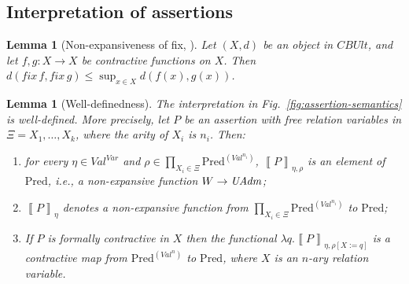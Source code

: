 \documentclass{LMCS}
\newtheorem{lemma}[theorem]{Lemma}
\theoremstyle{remark}
\newcommand{\Val}{\ensuremath{\mathit{Val}}\xspace}
\newcommand{\Var}{\ensuremath{\mathit{Var}}\xspace}
\newcommand{\den}[1]{\left\llbracket #1
  \right\rrbracket}
\newcommand{\Pred}{\ensuremath{\mathrm{Pred}}\xspace}
\newcommand{\CBUlt}{\mathit{CBUlt}\xspace}
\newcommand{\X}{\ensuremath{\Xi}}
\begin{document}
\subsection{Interpretation of assertions}
\label{subsec:app:interpretation-assertions}

\begin{lemma}[Non-expansiveness of fix, \cite{Birkedal:Stovring:Thamsborg:09}]
\label{lem:fix-non-expansiveness}
Let $(X,d)$ be an object in $\CBUlt$, and let $f,g : X\to X$ be contractive functions on $X$. 
Then $d(\textit{fix}\,f,\textit{fix}\,g)\leq \sup_{x\in X} d(f(x),g(x))$. 
\end{lemma}

\begin{lemma}[Well-definedness]
The interpretation in Fig.~\ref{fig:assertion-semantics} is well-defined. More precisely, let $P$ be an assertion with free relation variables in $\X = X_1,\ldots,X_k$, where the arity of $X_i$ is $n_i$. Then:
\begin{enumerate}
\item for every $\eta\in\Val^\Var$ and $\rho\in\prod_{X_i\in\X}\Pred^{(\Val^{n_i})}$, $\den{P}_{\eta,\rho}$ is an element of $\Pred$, i.e., a non-expansive function $W\to\mathit{UAdm}$; 
\item $\den{P}_{\eta}$ denotes a non-expansive function from $\prod_{X_i\in\X}\Pred^{(\Val^{n_i})}$ to $\Pred$; 
\item   If $P$ is formally contractive in $X$ then the functional $\lambda q.\den{P}_{\eta,\rho[X:=q]}$  is a contractive map from $\Pred^{(\Val^n)}$ to $\Pred$, where $X$ is an $n$-ary relation variable. 
\end{enumerate}
\end{lemma}
\end{document}
